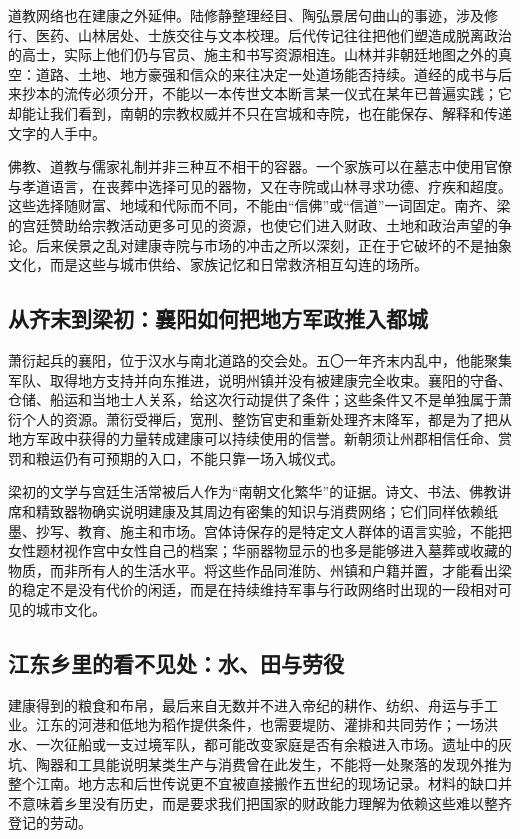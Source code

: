 道教网络也在建康之外延伸。陆修静整理经目、陶弘景居句曲山的事迹，涉及修行、医药、山林居处、士族交往与文本校理。后代传记往往把他们塑造成脱离政治的高士，实际上他们仍与官员、施主和书写资源相连。山林并非朝廷地图之外的真空：道路、土地、地方豪强和信众的来往决定一处道场能否持续。道经的成书与后来抄本的流传必须分开，不能以一本传世文本断言某一仪式在某年已普遍实践；它却能让我们看到，南朝的宗教权威并不只在宫城和寺院，也在能保存、解释和传递文字的人手中。

佛教、道教与儒家礼制并非三种互不相干的容器。一个家族可以在墓志中使用官僚与孝道语言，在丧葬中选择可见的器物，又在寺院或山林寻求功德、疗疾和超度。这些选择随财富、地域和代际而不同，不能由“信佛”或“信道”一词固定。南齐、梁的宫廷赞助给宗教活动更多可见的资源，也使它们进入财政、土地和政治声望的争论。后来侯景之乱对建康寺院与市场的冲击之所以深刻，正在于它破坏的不是抽象文化，而是这些与城市供给、家族记忆和日常救济相互勾连的场所。

\subsection{从齐末到梁初：襄阳如何把地方军政推入都城}

萧衍起兵的襄阳，位于汉水与南北道路的交会处。五〇一年齐末内乱中，他能聚集军队、取得地方支持并向东推进，说明州镇并没有被建康完全收束。襄阳的守备、仓储、船运和当地士人关系，给这次行动提供了条件；这些条件又不是单独属于萧衍个人的资源。萧衍受禅后，宽刑、整饬官吏和重新处理齐末降军，都是为了把从地方军政中获得的力量转成建康可以持续使用的信誉。新朝须让州郡相信任命、赏罚和粮运仍有可预期的入口，不能只靠一场入城仪式。

梁初的文学与宫廷生活常被后人作为“南朝文化繁华”的证据。诗文、书法、佛教讲席和精致器物确实说明建康及其周边有密集的知识与消费网络；它们同样依赖纸墨、抄写、教育、施主和市场。宫体诗保存的是特定文人群体的语言实验，不能把女性题材视作宫中女性自己的档案；华丽器物显示的也多是能够进入墓葬或收藏的物质，而非所有人的生活水平。将这些作品同淮防、州镇和户籍并置，才能看出梁的稳定不是没有代价的闲适，而是在持续维持军事与行政网络时出现的一段相对可见的城市文化。

\subsection{江东乡里的看不见处：水、田与劳役}

建康得到的粮食和布帛，最后来自无数并不进入帝纪的耕作、纺织、舟运与手工业。江东的河港和低地为稻作提供条件，也需要堤防、灌排和共同劳作；一场洪水、一次征船或一支过境军队，都可能改变家庭是否有余粮进入市场。遗址中的灰坑、陶器和工具能说明某类生产与消费曾在此发生，不能将一处聚落的发现外推为整个江南。地方志和后世传说更不宜被直接搬作五世纪的现场记录。材料的缺口并不意味着乡里没有历史，而是要求我们把国家的财政能力理解为依赖这些难以整齐登记的劳动。

